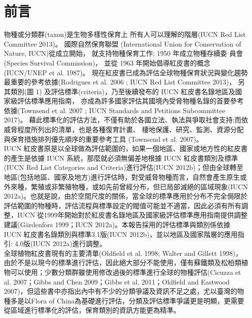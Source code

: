 \chapter{前言}

\linespread{1.5}\selectfont
\begin{multicols}{2}
物種或分類群(taxon)是生物多樣性保育上 所有人可以理解的階層(IUCN Red List Committee 2013)。
國際自然保育聯盟 (International Union for Conservation of Nature, IUCN)從成立開始，
就支持物種保育工作; 1950 年成立物種存續委 員會(Species Survival Commission)，
並從 1963 年開始倡導紅皮書的概念(IUCN/UNEP et al. 1987)。
現在紅皮書已成為評估全球物種保育狀況與變化趨勢最重要的參考依據(Rodrigues et al. 2006 ; IUCN Red List Committee 2013)，
另其類別(圖 1) 及評估標準(criteria)，乃至後續發布的 IUCN 紅皮書名錄地區及國家級評估標準應用指南，
亦成為許多國家評估其國境內受脅物種名錄的首要參考依據(Townsend et al. 2007 ; IUCN Standards and Petitions Subcommittee 2017)。
藉此標準化的評估方法，不僅有助於各國立法、執法與爭取社會支持;而依威脅程度所列出的清單，也是各種復育計畫、
棲地保護、研究、監測、資源分配與保育措施排列優先順序的重要參考工具 (Townsend et al. 2007)。\\

IUCN 紅皮書原是以全球做為評估範圍的，如果一個地區、國家或地方性的紅皮書的產生是依據 IUCN 系統，那麼就必須無偏差地根據 IUCN 紅皮書類別及標準(IUCN Red List Categories and Criteria)進行評估(IUCN 2012b)；但由全球轉至地區(包括地區、國家及地方)進行評估時，對受威脅物種而言，自然會產生原生或外來種，繁殖或非繁殖物種，或如先前曾經分布，但已局部滅絕的區域現象(IUCN 2012a)。也就是說，由於空間尺度的關係，當全球的標準應用於分布不完全侷限於評估範圍的物種時，評估流程與標準設定的閥值可能並不適當，因此必須有所有調整，IUCN 從1999年開始對於紅皮書名錄地區及國家級評估標準應用指南提供調整建議(Gärdenfors 1999；IUCN 2012a)。本報告採用的評估標準與類別係依據 IUCN 紅皮書名錄類別與標準3.1版(IUCN 2012b)，並以地區及國家階層的應用指引: 4.0版(IUCN 2012a)進行調整。\\

全球植物紅皮書現有的主要清單(Oldfield et al. 1998; Walter and Gillett 1998)，由於不是以現今的標準進行評估，因此絕大部分不能使用，僅有蘇鐵類及松柏類植物可以使用；少數分類群雖使用修改過後的標準進行全球的物種評估(Cicuzza et al. 2007；Gibbs and Chen 2009；Gibbs et al. 2011；Oldfield and Eastwood 2007)，但這些書中亦指出內中有不少的分類爭議及資訊不足之處，尤以臺灣的物種多是以Flora of China為基礎進行評估，分類及評估標準爭議更是明顯，更需要從區域進行標準化的評估，保育類別的資訊方能更為精準。 \\


\end{multicols}
